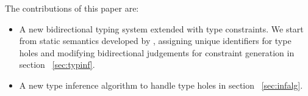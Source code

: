 

 The contributions of this paper are:
\begin{itemize}
  \item A new bidirectional typing system extended with type constraints. We start from static semantics developed by \citet{HazelnutPOPL}, assigning unique identifiers for type holes and modifying bidirectional judgements for constraint generation in section ~\ref{sec:typinf}.
  \item A new type inference algorithm to handle type holes in section ~\ref{sec:infalg}.
\end{itemize}

